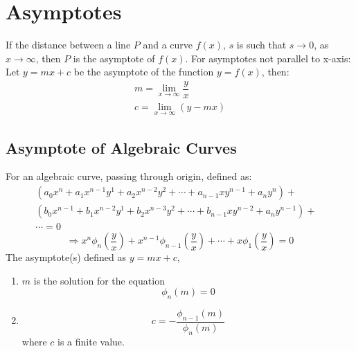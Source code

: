 \section{Asymptotes}
If the distance between a line $P$ and a curve $f(x)$, $s$ is such that $s\to0$, as $x\to\infty$, then $P$ is the asymptote of $f(x)$. For asymptotes not parallel to x-axis:\newline
Let $y=mx+c$ be the asymptote of the function $y=f(x)$, then:
\begin{align}
	m=\lim_{x\to\infty} \dfrac{y}{x}\\
	c=\lim_{x\to\infty} (y-mx)
\end{align}

\subsection{Asymptote of Algebraic Curves}
For an algebraic curve, passing through origin, defined as:
\begin{equation}
	\begin{aligned}
			(a_0x^n+a_1x^{n-1}y^1+a_2x^{n-2}y^2+\cdots+a_{n-1}xy^{n-1}+a_n y^n)+&\\
			(b_0x^{n-1}+b_1x^{n-2}y^1+b_2x^{n-3}y^2+\cdots+b_{n-1}xy^{n-2}+a_n y^{n-1})+&\\
			\cdots=0\nonumber
	\end{aligned}
\end{equation}
\begin{equation}
	\Rightarrow x^n\phi_n\left(\dfrac{y}{x}\right)+x^{n-1}\phi_{n-1}\left(\dfrac{y}{x}\right)+\cdots+x\phi_1\left(\dfrac{y}{x}\right)=0\nonumber
\end{equation}
The asymptote(s) defined as $y=mx+c$,
\begin{enumerate}
	\item $m$ is the solution for the equation
	\begin{equation}
		\phi_n(m)=0
	\end{equation}
	\item \begin{equation}
		c=-\dfrac{\phi_{n-1}(m)}{\phi_n (m)}
	\end{equation}
	where $c$ is a finite value.
\end{enumerate}
